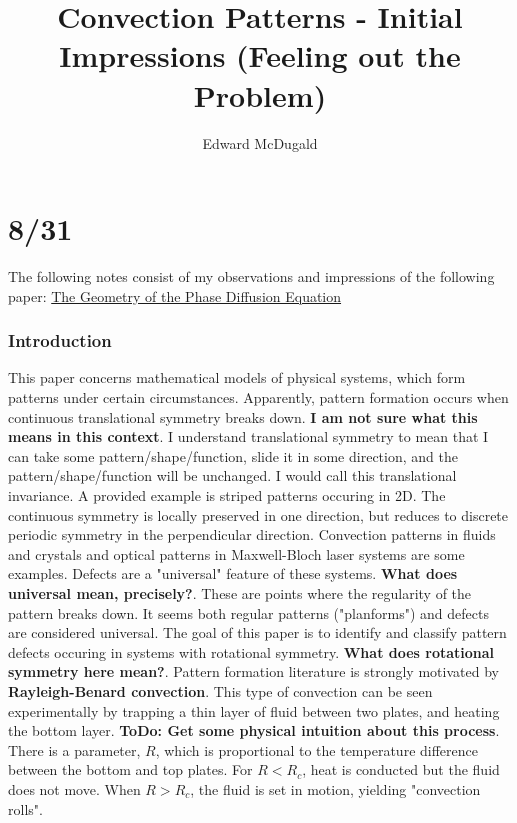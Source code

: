 \documentclass[12pt]{article}
\title{Convection Patterns - Initial Impressions (Feeling out the Problem)}
\author{Edward McDugald}
\begin{document}
\maketitle


\part{8/31}
The following notes consist of my observations and impressions of the following paper:\newline
\href{https://www.math.arizona.edu/~anewell/publications/Geometry_Phase_Diffusion_Eq.pdf}{The Geometry of the Phase Diffusion Equation}
\section{Introduction}
\hspace*{10mm} This paper concerns mathematical models of physical systems, which form patterns under certain circumstances.
Apparently, pattern formation occurs when continuous translational symmetry breaks down. \textbf{I am not sure what this means in this context}. I understand translational symmetry to mean that I can take some pattern/shape/function, slide it in some direction, and the pattern/shape/function will be unchanged. I would call this translational invariance.
A provided example is striped patterns occuring in 2D. The continuous symmetry is locally preserved in one direction, but reduces to discrete periodic symmetry in the perpendicular direction. Convection patterns in fluids and crystals and optical patterns in Maxwell-Bloch laser systems are some examples.\newline
\hspace*{10mm} Defects are a "universal" feature of these systems. \textbf{What does universal mean, precisely?}. These are points where the regularity of the pattern breaks down. It seems both regular patterns ("planforms") and defects are considered universal. The goal of this paper is to identify and classify pattern defects occuring in systems with rotational symmetry.
\textbf{What does rotational symmetry here mean?}. \newline
\hspace*{10mm} Pattern formation literature is strongly motivated by \textbf{Rayleigh-Benard convection}. This type of convection can be seen experimentally by trapping a thin layer of fluid between two plates, and heating the bottom layer. \textbf{ToDo: Get some physical intuition about this process}. There is a parameter, $R$, which is proportional to the temperature difference between the bottom and top plates. For $R<R_c$, heat is conducted but the fluid does not move. When $R>R_c$, the fluid is set in motion, yielding "convection rolls".\newline
\end{document}
